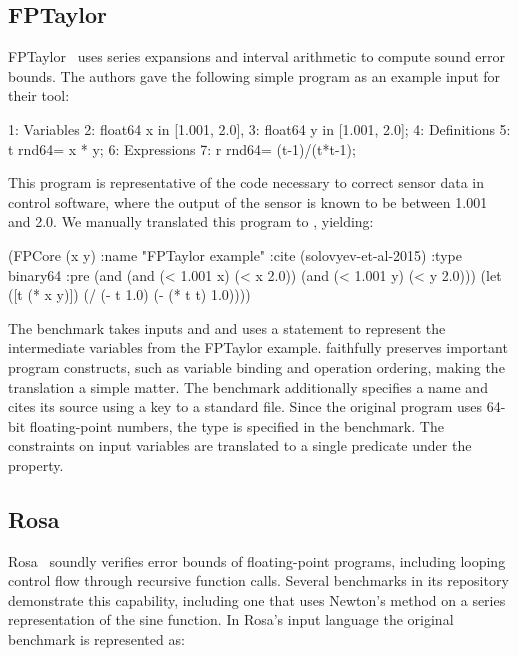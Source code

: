 \documentclass[main.tex]{subfiles}
\begin{document}
\subsection{FPTaylor}


FPTaylor~\cite{fptaylor-fm15} uses series expansions and interval
arithmetic to compute sound error bounds. The authors gave the following
simple program as an example input for their tool:

\begin{code}
1: Variables
2:   float64 x in [1.001, 2.0],
3:   float64 y in [1.001, 2.0];
4: Definitions
5:   t rnd64= x * y;
6: Expressions
7:   r rnd64= (t-1)/(t*t-1);
\end{code}

This program is representative of the code necessary to correct sensor data
in control software, where the output of the sensor is known to be between
1.001 and 2.0. We manually translated this program to \core, yielding:

\begin{code}
(FPCore (x y)
  :name "FPTaylor example"
  :cite (solovyev-et-al-2015)
  :type binary64
  :pre (and (and (< 1.001 x) (< x 2.0)) (and (< 1.001 y) (< y 2.0)))
  (let ([t (* x y)])
    (/ (- t 1.0)  (- (* t t) 1.0))))
\end{code}

The benchmark takes inputs  and 
  and uses a  statement to represent the intermediate variables
  from the FPTaylor example.
\core faithfully preserves important program constructs,
  such as variable binding and operation ordering,
  making the translation a simple matter.
The benchmark additionally specifies a name
  and cites its source using a key to a standard \BibTeX{} file.
Since the original program uses 64-bit floating-point numbers,
  the type  is specified in the benchmark.
The constraints on input variables are translated to
  a single predicate under the  property.


\subsection{Rosa}

Rosa~\cite{DarulovaK14} soundly verifies error bounds of floating-point
programs, including looping control flow through recursive function calls.
Several benchmarks in its repository demonstrate this capability, including
one that uses Newton's method on a series representation of the sine
function.  In Rosa's input language the original benchmark is represented
as:
\end{document}
